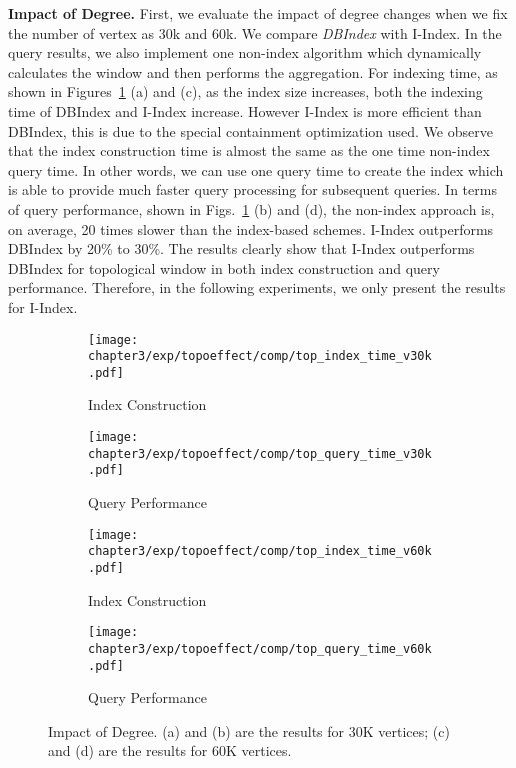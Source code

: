\textbf{Impact of Degree.} First, we evaluate the impact of degree 
changes when we fix the number of vertex as 30k and 60k.  
We compare \emph{DBIndex} with I-Index. 
In the query results, we also implement one non-index algorithm 
which dynamically calculates the window and then performs the aggregation. 
For indexing time, as shown in Figures~\ref{fig:pi_effect} (a) and (c), as the 
index size increases, both the indexing time of 
DBIndex and I-Index increase. However I-Index is more efficient than 
DBIndex, this is due to the special containment optimization used.  We observe that the 
index construction time is almost the same as the one time non-index query time. In other words, 
we can use one query time to create the index which is able to provide much faster query processing for subsequent queries. 
 In terms of query performance, shown in Figs.~\ref{fig:pi_effect} (b) and 
(d), the non-index approach is, on average, 20 times slower than 
the index-based schemes. I-Index outperforms DBIndex by 20\% to 30\%. 
The results clearly show that I-Index outperforms DBIndex for topological 
window in both index construction and query performance. Therefore, in the following experiments, we only present the results for I-Index. 
 
\begin{figure}
\centering
\begin{subfigure}{0.48\linewidth}
  \centering
  \texttt{[image: chapter3/exp/topoeffect/comp/top\_index\_time\_v30k.pdf]}
  \caption{Index Construction}
\end{subfigure}
\begin{subfigure}{0.48\linewidth}
  \centering
  \texttt{[image: chapter3/exp/topoeffect/comp/top\_query\_time\_v30k.pdf]}
  \caption{Query Performance}
\end{subfigure}
\begin{subfigure}{0.48\linewidth}
  \centering
  \texttt{[image: chapter3/exp/topoeffect/comp/top\_index\_time\_v60k.pdf]}
  \caption{Index Construction}
\end{subfigure}
\begin{subfigure}{0.48\linewidth}
  \centering
  \texttt{[image: chapter3/exp/topoeffect/comp/top\_query\_time\_v60k.pdf]}
  \caption{Query Performance}
\end{subfigure}
\caption{Impact of Degree. (a) and (b) are the results for 30K vertices; (c) and (d) are the results for 60K vertices.}
\label{fig:pi_effect}
\end{figure}


